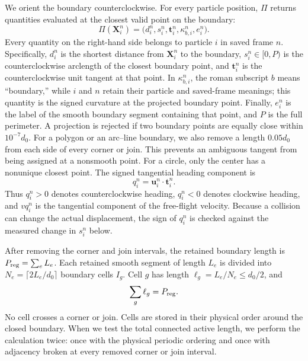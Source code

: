 \documentclass[11pt]{article}
\numberwithin{equation}{section}
\begin{document}
We orient the boundary counterclockwise.  For every particle position,
$\Pi$ returns quantities evaluated at the closest valid point on the boundary:
\begin{equation}
  \Pi(\mathbf X_i^n)
  =\bigl(d_i^n,s_i^n,\mathbf t_i^n,\kappa_{b,i}^n,e_i^n\bigr).
  \label{eq:boundary_projection_tuple}
\end{equation}
Every quantity on the right-hand side belongs to particle $i$ in saved frame
$n$.  Specifically, $d_i^n$ is the shortest distance from $\mathbf X_i^n$ to
the boundary, $s_i^n\in[0,P)$ is the counterclockwise arclength of the closest
boundary point, and $\mathbf t_i^n$ is the counterclockwise unit tangent at that
point.  In $\kappa_{b,i}^n$, the roman subscript $b$ means ``boundary,'' while
$i$ and $n$ retain their particle and saved-frame meanings; this quantity is
the signed curvature at the projected boundary point.  Finally, $e_i^n$ is the
label of the smooth boundary segment containing that point, and $P$ is the full
perimeter.  A projection is rejected if two boundary points are equally close
within $10^{-7}d_0$.  For a polygon or an arc--line boundary, we also remove a
length $0.05d_0$ from each side of every corner or join.  This prevents an
ambiguous tangent from being assigned at a nonsmooth point.  For a circle,
only the center has a nonunique closest point.  The signed tangential heading
component is
\begin{equation}
  q_i^n=\mathbf u_i^n\cdot\mathbf t_i^n.
  \label{eq:boundary_q_definition}
\end{equation}
Thus $q_i^n>0$ denotes counterclockwise heading, $q_i^n<0$ denotes clockwise
heading, and $vq_i^n$ is the tangential component of the free-flight velocity.
Because a collision can change the actual displacement, the sign of $q_i^n$
is checked against the measured change in $s_i^n$ below.

After removing the corner and join intervals, the retained boundary length is
$P_{\rm reg}=\sum_eL_e$.  Each retained smooth segment of length $L_e$ is
divided into
$N_e=\lceil2L_e/d_0\rceil$ boundary cells $I_g$.  Cell $g$ has length
$\ell_g=L_e/N_e\le d_0/2$, and
\begin{equation}
  \sum_g\ell_g=P_{\rm reg}.
  \label{eq:boundary_gate_lengths}
\end{equation}
No cell crosses a corner or join.  Cells are stored in their physical order
around the closed boundary.  When we test the total connected active length,
we perform the calculation twice: once with the physical periodic ordering and
once with adjacency broken at every removed corner or join interval.
\end{document}
